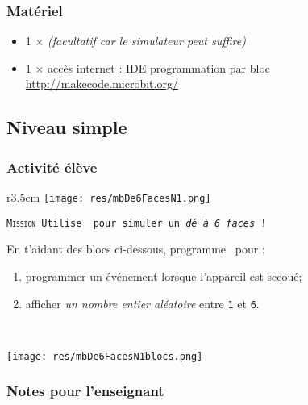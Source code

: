 \subsubsection{Matériel}
\begin{itemize}
    \item 1 $\times$ \matosMb \emph{(facultatif car le simulateur peut suffire)}
    \item 1 $\times$ accès internet : IDE programmation par bloc \url{http://makecode.microbit.org/}
\end{itemize}


%
%
\newpage
\subsection{Niveau simple}
\subsubsection{Activité élève}


\begin{eleve}

\begin{wrapfigure}[4]{r}{3.5cm}
	\texttt{[image: res/mbDe6FacesN1.png]}
\end{wrapfigure}

\texttt{\textsc{Mission} Utilise \mb~pour simuler un \emph{dé à 6 faces} !}


En t'aidant des blocs ci-dessous, programme \mb~pour : 
\begin{enumerate}
    \item programmer un événement lorsque l'appareil est secoué;
    \item afficher \emph{un nombre entier aléatoire} entre \texttt{1} et \texttt{6}.
\end{enumerate}
~\\
\centerline{\texttt{[image: res/mbDe6FacesN1blocs.png]}}

\end{eleve}


\subsubsection{Notes pour l'enseignant}

